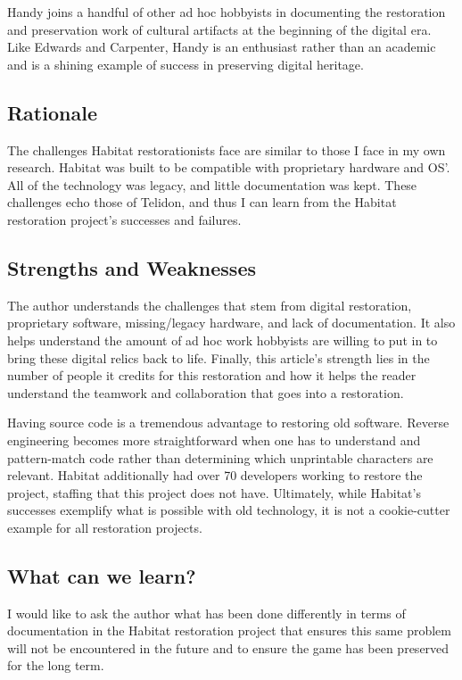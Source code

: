 \documentclass[sigconf]{acmart}
\begin{document}
Handy joins a handful of other ad hoc hobbyists in documenting the restoration and preservation work of cultural artifacts at the beginning of the digital era. Like Edwards and Carpenter, Handy is an enthusiast rather than an academic and is a shining example of success in preserving digital heritage.

\subsection{Rationale}

The challenges Habitat restorationists face are similar to those I face in my own research. Habitat was built to be compatible with proprietary hardware and OS'. All of the technology was legacy, and little documentation was kept. These challenges echo those of Telidon, and thus I can learn from the Habitat restoration project's successes and failures. 

\subsection{Strengths and Weaknesses}

The author understands the challenges that stem from digital restoration, proprietary software, missing/legacy hardware, and lack of documentation. It also helps understand the amount of ad hoc work hobbyists are willing to put in to bring these digital relics back to life. Finally, this article's strength lies in the number of people it credits for this restoration and how it helps the reader understand the teamwork and collaboration that goes into a restoration. 

Having source code is a tremendous advantage to restoring old software. Reverse engineering becomes more straightforward when one has to understand and pattern-match code rather than determining which unprintable characters are relevant. Habitat additionally had over 70 developers working to restore the project, staffing that this project does not have. Ultimately, while Habitat's successes exemplify what is possible with old technology, it is not a cookie-cutter example for all restoration projects.

\subsection{What can we learn?}

I would like to ask the author what has been done differently in terms of documentation in the Habitat restoration project that ensures this same problem will not be encountered in the future and to ensure the game has been preserved for the long term.
\end{document}
